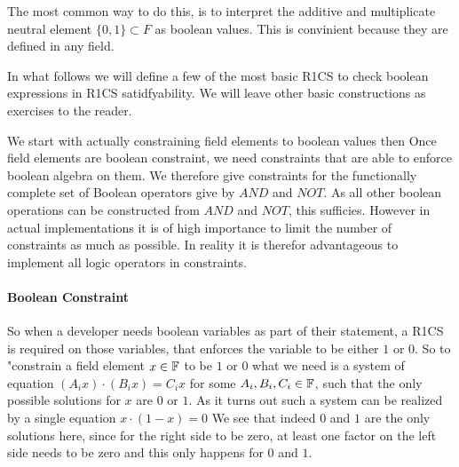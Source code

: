 The most common way to do this, is to interpret the additive and multiplicate neutral element $\{0,1\}\subset F$ as boolean values. This is convinient because they are defined in any field. 

In what follows we will define a few of the most basic R1CS to check boolean expressions in R1CS satidfyability. We will leave other basic constructions as exercises to the reader. 

We start with actually constraining field elements to boolean values then   
Once field elements are boolean constraint, we need constraints that are able to enforce boolean algebra on them. We therefore give constraints for the functionally complete set of Boolean operators give by $AND$ and $NOT$. As all other boolean operations can be constructed from $AND$ and $NOT$, this sufficies. However in actual implementations it is of high importance to limit the number of constraints as much as possible. In reality it is therefor advantageous to implement all logic operators in constraints.

\paragraph{Boolean Constraint}
So when a developer needs boolean variables as part of their statement, a R1CS is required on those variables, that enforces the variable to be either $1$ or $0$. So to "constrain a field element $x\in \mathbb{F}$ to be $1$ or $0$ what we need is a system of equation $(A_ix)\cdot (B_ix) = C_ix$ for some $A_i,B_i,C_i\in \mathbb{F}$, such that the only possible solutions for $x$ are $0$ or $1$.
As it turns out such a system can be realized by a single equation
$x \cdot (1-x) =0$
We see that indeed $0$ and $1$ are the only solutions here, since for the right side to be zero, at least one factor on the left side needs to be zero and this only happens for $0$ and $1$. 

